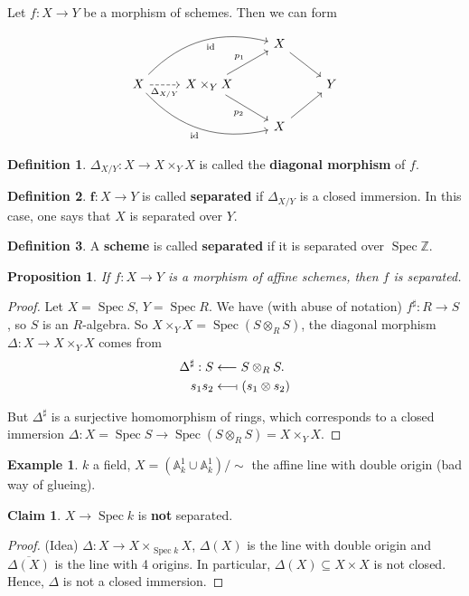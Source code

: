 \documentclass[12pt]{article}
\DeclareMathOperator{\id}{id}
\DeclareMathOperator{\Spec}{Spec}
\newtheorem*{proposition}{Proposition}
\theoremstyle{definition}
\newtheorem*{definition}{Definition}
\newtheorem*{claim}{Claim}
\newtheorem*{example}{Example}
\theoremstyle{remark}
\begin{document}
Let $f:X\rightarrow Y$ be a morphism of schemes. Then we can form
\[
\begin{tikzcd}
&&X\arrow[rd]\\
X\arrow[r,"\Delta_{X/Y}",dashed,swap]\arrow[rru,"\id",swap,bend left]\arrow[rrd,"\id",swap,bend right]&X\times_YX\arrow[ru,"p_1"]\arrow[rd,"p_2",swap]&&Y\\
&&X\arrow[ru]
\end{tikzcd}
\]

\begin{definition}
$\Delta_{X/Y}:X\rightarrow X\times_YX$ is called the \textbf{diagonal morphism} of $f$.
\end{definition}

\begin{definition}
$\boldsymbol{f}:X\rightarrow Y$ is called \textbf{separated} if $\Delta_{X/Y}$ is a closed immersion. In this case, one says that $X$ is separated over $Y$.
\end{definition}

\begin{definition}
A \textbf{scheme} is called \textbf{separated} if it is separated over $\Spec\mathbb{Z}$.
\end{definition}

\begin{proposition}
If $f:X\rightarrow Y$ is a morphism of affine schemes, then $f$ is separated.
\end{proposition}

\begin{proof}
Let $X=\Spec S$, $Y=\Spec R$. We have (with abuse of notation) $f^{\sharp}:R\rightarrow S$, so $S$ is an $R$-algebra. So $X\times_YX=\Spec(S\otimes_RS)$, the diagonal morphism $\Delta:X\rightarrow X\times_YX$ comes from
\begin{align*}
\Delta^{\sharp}:S&\longleftarrow S\otimes_RS.\\
s_1s_2&\longleftarrow\!\shortmid(s_1\otimes s_2)
\end{align*}

But $\Delta^{\sharp}$ is a surjective homomorphism of rings, which corresponds to a closed immersion $\Delta:X=\Spec S\rightarrow\Spec(S\otimes_RS)=X\times_YX$.
\end{proof}

\begin{example}
$k$ a field, $X=(\mathbb{A}_k^1\cup\mathbb{A}_k^1)/\sim$ the affine line with double origin (bad way of glueing).

\begin{claim}
$X\rightarrow\Spec k$ is \textbf{not} separated.
\end{claim}

\begin{proof}
(Idea) $\Delta:X\rightarrow X\times_{\Spec k}X$, $\Delta(X)$ is the line with double origin and $\overline{\Delta(X)}$ is the line with 4 origins. In particular, $\Delta(X)\subseteq X\times X$ is not closed. Hence, $\Delta$ is not a closed immersion.
\end{proof}
\end{example}
\end{document}
